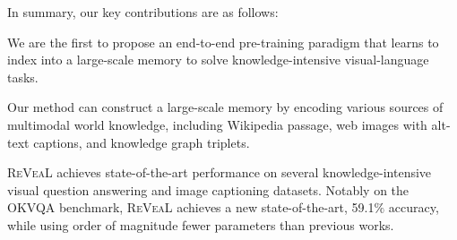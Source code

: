 \documentclass[10pt,twocolumn,letterpaper]{article}
\newcommand{\method}{R\textsc{e}V\textsc{ea}L\xspace}
\begin{document}
In summary, our key contributions are as follows: 
\begin{compactitem}
\item 
We are the first to propose an end-to-end pre-training paradigm that learns to index into a large-scale memory to solve knowledge-intensive visual-language tasks.
\item
Our method can construct a large-scale memory by encoding various sources of multimodal world knowledge, including Wikipedia passage, web images with alt-text captions, and knowledge graph triplets.
\item
\method achieves state-of-the-art performance on several knowledge-intensive visual question answering and image captioning datasets. Notably on the OKVQA benchmark, \method achieves a new state-of-the-art, 59.1$\%$ accuracy, while using order of magnitude fewer parameters than previous works.
\end{compactitem}
\end{document}

